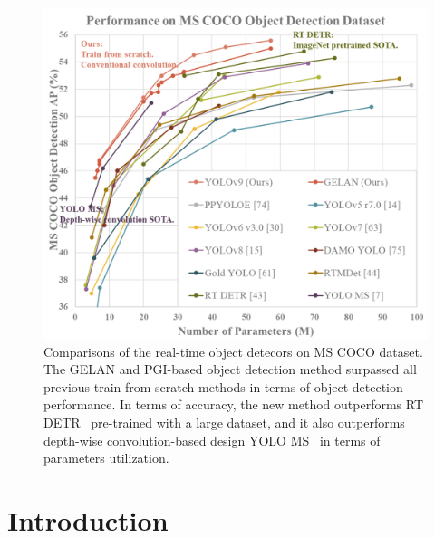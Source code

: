 \documentclass[10pt,twocolumn,letterpaper]{article}
\begin{document}
	\begin{figure}[t]
		\begin{center}
			\includegraphics[width=.91\linewidth]{figs/sota}
		\end{center}
		\vspace{-10pt}
		\caption{Comparisons of the real-time object detecors on MS COCO dataset.  The GELAN and PGI-based object detection method surpassed all previous train-from-scratch methods in terms of object detection performance.  In terms of accuracy, the new method outperforms RT DETR~\cite{lv2023detrs} pre-trained with a large dataset, and it also outperforms depth-wise convolution-based design YOLO MS~\cite{chen2023yolo} in terms of parameters utilization.}	
		\label{fig:sota}	
		\vspace{-16pt}
	\end{figure}
	
	\section{Introduction}
	\label{sec:intr}
	
	\vspace{-4pt}
	
\end{document}
